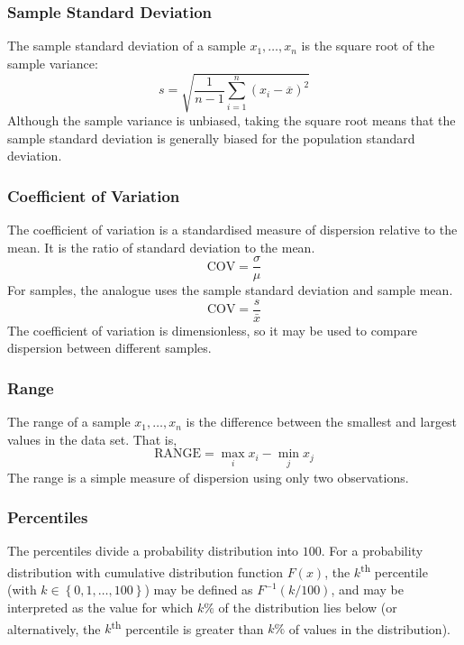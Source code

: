 \documentclass[11pt]{report} %
\begin{document}
\subsubsection{Sample Standard Deviation}

The sample standard deviation of a sample $x_{1}, \dots, x_{n}$ is the square root of the sample variance:
\begin{equation}
s = \sqrt{\dfrac{1}{n - 1}\sum_{i = 1}^{n}\left(x_{i} - \overline{x}\right)^{2}}
\end{equation}
Although the sample variance is unbiased, taking the square root means that the sample standard deviation is generally biased for the population standard deviation.

\subsubsection{Coefficient of Variation}

The coefficient of variation is a standardised measure of dispersion relative to the mean. It is the ratio of standard deviation to the mean.
\begin{equation}
\mathrm{COV} = \dfrac{\sigma}{\mu}
\end{equation}
For samples, the analogue uses the sample standard deviation and sample mean.
\begin{equation}
\mathrm{COV} = \dfrac{s}{\bar{x}}
\end{equation}
The coefficient of variation is dimensionless, so it may be used to compare dispersion between different samples.

\subsubsection{Range}

The range of a sample $x_{1}, \dots, x_{n}$ is the difference between the smallest and largest values in the data set. That is,
\begin{equation}
\mathrm{RANGE} = \max_{i}x_{i} - \min_{j}x_{j}
\end{equation}
The range is a simple measure of dispersion using only two observations.

\subsubsection{Percentiles}

The percentiles divide a probability distribution into $100$. For a probability distribution with cumulative distribution function $F\left(x\right)$, the $k$\textsuperscript{th} percentile (with $k \in \left\{0, 1, \dots, 100\right\}$) may be defined as $F^{-1}\left(k/100\right)$, and may be interpreted as the value for which $k\%$ of the distribution lies below (or alternatively, the $k$\textsuperscript{th} percentile is greater than $k\%$ of values in the distribution). \\
\end{document}
